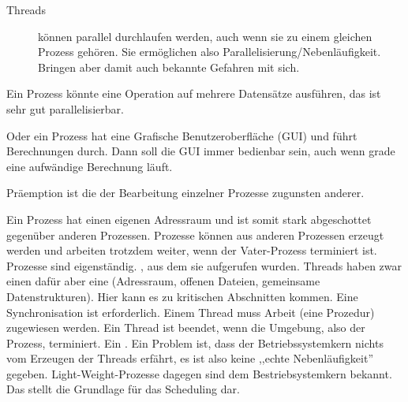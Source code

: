 \begin{answer}
\begin{description}
\item[Threads] können parallel durchlaufen werden, auch wenn sie zu einem gleichen Prozess gehören. Sie ermöglichen also Parallelisierung/Nebenläufigkeit. Bringen aber damit auch bekannte Gefahren mit sich. 
\end{description}

Ein Prozess könnte eine Operation auf mehrere Datensätze ausführen, das ist sehr gut parallelisierbar.

Oder ein Prozess hat eine Grafische Benutzeroberfläche (GUI) und führt Berechnungen durch. Dann soll die GUI immer bedienbar sein, auch wenn grade eine aufwändige Berechnung läuft.
\end{answer}

\begin{answer}
Präemption ist die  der Bearbeitung einzelner Prozesse zugunsten anderer.
\end{answer}

\begin{answer}
Ein Prozess hat einen eigenen Adressraum und ist somit stark abgeschottet gegenüber anderen
Prozessen. Prozesse können aus anderen Prozessen erzeugt werden und arbeiten trotzdem weiter,
wenn der Vater-Prozess terminiert ist. Prozesse sind eigenständig.
, aus dem sie aufgerufen
wurden. Threads haben zwar einen  dafür aber eine
 (Adressraum, offenen Dateien, gemeinsame Datenstrukturen). Hier kann 
es zu kritischen Abschnitten kommen. Eine Synchronisation ist erforderlich. Einem Thread muss
Arbeit (eine Prozedur) zugewiesen werden. Ein Thread ist beendet, wenn die Umgebung, also der Prozess,
terminiert. Ein .
Ein Problem ist, dass der Betriebssystemkern nichts vom Erzeugen der Threads erfährt, es ist also
keine ,,echte Nebenläufigkeit'' gegeben.
Light-Weight-Prozesse dagegen sind dem Bestriebsystemkern bekannt. Das stellt die Grundlage
für das Scheduling dar.
\end{answer}

